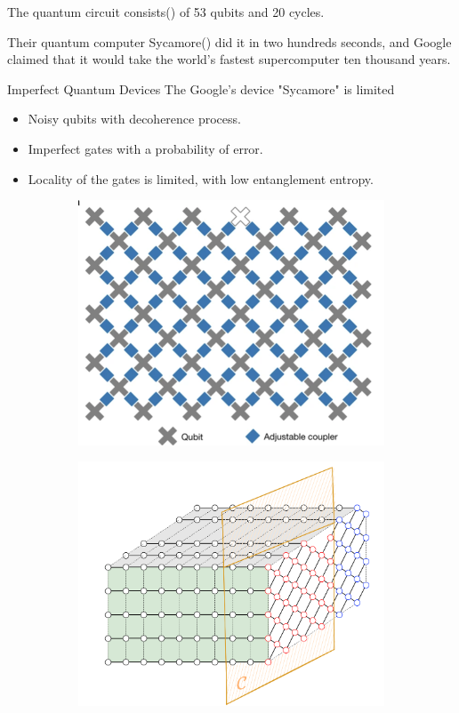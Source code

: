 \documentclass[10pt]{beamer}
\begin{document}
\begin{CJK}{UTF8}{gbsn}
{The quantum circuit consists() of 53 qubits and 20 cycles.

Their quantum computer Sycamore() did it in two hundreds seconds, and Google claimed that it would take the world’s fastest supercomputer ten thousand years.
}


\begin{frame}[fragile]{Imperfect Quantum Devices}
 The Google's device "Sycamore" is limited
  \begin{itemize}
    \item Noisy qubits with decoherence process.
    \item Imperfect gates with a probability of error.
    \item Locality of the gates is limited, with low entanglement entropy.
  \end{itemize}
  \begin{figure}
    \centering
    \begin{subfigure}[b]{0.4\textwidth}
      \includegraphics[width=\textwidth]{fig/google2.png}
    \end{subfigure}
    \hfill
    \begin{subfigure}[b]{0.4\textwidth}
      \includegraphics[width=\textwidth]{fig/google3.png}

\end{subfigure}
\end{figure}
\end{frame}
\end{CJK}
\end{document}
